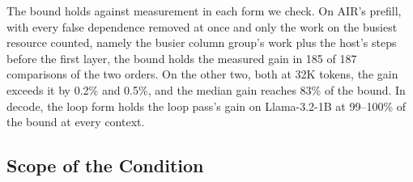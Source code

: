 The bound holds against measurement in each form we check.
On AIR's prefill, with every false dependence removed at once and only the work on the busiest resource counted, namely the busier column group's work plus the host's steps before the first layer, the bound holds the measured gain in 185 of 187 comparisons of the two orders.
On the other two, both at 32K tokens, the gain exceeds it by 0.2\% and 0.5\%, and the median gain reaches 83\% of the bound.
In decode, the loop form holds the loop pass's gain on Llama-3.2-1B at 99--100\% of the bound at every context.

\subsection{Scope of the Condition}
\label{subsec:pays}

